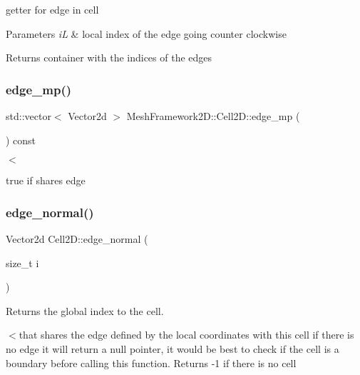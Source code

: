 getter for edge in cell 


\begin{DoxyParams}{Parameters}
{\em iL} & local index of the edge going counter clockwise\\
\hline
\end{DoxyParams}
\begin{DoxyReturn}{Returns}
container with the indices of the edges 
\end{DoxyReturn}
\mbox{\label{classMeshFramework2D_1_1Cell2D_a556bc73467e350e7a323ff5f506fdc26}} 
\subsubsection{\texorpdfstring{edge\+\_\+mp()}{edge\_mp()}}
{\footnotesize\ttfamily std\+::vector$<$ Vector2d $>$ Mesh\+Framework2\+D\+::\+Cell2\+D\+::edge\+\_\+mp (\begin{DoxyParamCaption}{ }\end{DoxyParamCaption}) const\hspace{0.3cm}{\ttfamily [inline]}}



$<$ 

true if shares edge \mbox{\label{classMeshFramework2D_1_1Cell2D_a50635f2a486a9af7aa89d6af4dc17422}} 
\subsubsection{\texorpdfstring{edge\+\_\+normal()}{edge\_normal()}}
{\footnotesize\ttfamily Vector2d Cell2\+D\+::edge\+\_\+normal (\begin{DoxyParamCaption}\item[{size\+\_\+t}]{i }\end{DoxyParamCaption})}



Returns the global index to the cell. 

$<$that shares the edge defined by the local coordinates with this cell if there is no edge it will return a null pointer, it would be best to check if the cell is a boundary before calling this function. Returns -\/1 if there is no cell \mbox{\label{classMeshFramework2D_1_1Cell2D_a55049e977f519dc8a161a61726fdac23}} 
